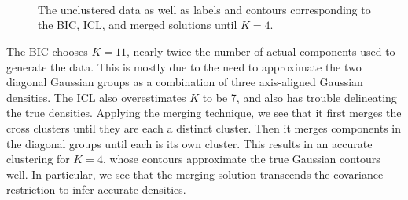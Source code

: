 \documentclass{uwstat572}
\renewcommand\;{\,}
\begin{document}
\begin{figure}
\begin{center}
\\ \vspace{-1em}
\\ \vspace{-1em}
\\ \vspace{-1em}
\end{center}
\vspace{-1em}
\caption{
The unclustered data as well as labels and contours corresponding to the BIC, ICL, and merged solutions until $K = 4$.}
\label{Example2}
\end{figure}

The BIC chooses $K = 11$, nearly twice the number of actual components used to generate the data.
This is mostly due to the need to approximate the two diagonal Gaussian groups as a combination of three axis-aligned Gaussian densities.
The ICL also overestimates $K$ to be 7, and also has trouble delineating the true densities.
Applying the merging technique, we see that it first merges the cross clusters until they are each a distinct cluster.
Then it merges components in the diagonal groups until each is its own cluster.
This results in an accurate clustering for $K = 4$, whose contours approximate the true Gaussian contours well.
In particular, we see that the merging solution transcends the covariance restriction to infer accurate densities. 
\end{document}
